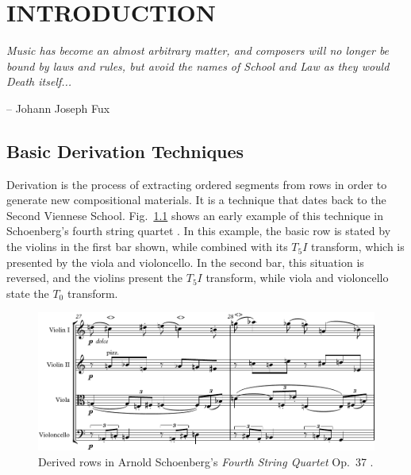 \chapter{INTRODUCTION}

\vspace{3em}
\setlength{\epigraphwidth}{0.86\textwidth}
\setlength{\epigraphrule}{0pt}
\epigraph{
	\textit{Music has become an almost arbitrary matter, and composers will no longer be bound by laws and rules, but avoid the names of School and Law as they would Death itself...}
}{\vspace{2em}-- Johann Joseph Fux}
\vspace{1em}

\section{Basic Derivation Techniques}

Derivation is the process of extracting ordered segments from rows in order to generate new compositional materials. It is a technique that dates back to the Second Viennese School. Fig.~\ref{fig:schoenberg-quartet} shows an early example of this technique in Schoenberg's fourth string quartet \cite[100]{Westergaard1966}. In this example, the basic row is stated by the violins in the first bar shown, while combined with its $T_5I$ transform, which is presented by the viola and violoncello. In the second bar, this situation is reversed, and the violins present the $T_5I$ transform, while viola and violoncello state the $T_0$ transform.

\begin{figure}[htbp]
    \centering
	\includegraphics[width=6.5in]{figures/Schoenberg_4.pdf}
	\caption[Schoenberg's \emph{Fourth String Quartet} Op.~37]{Derived rows in Arnold Schoenberg's \emph{Fourth String Quartet} Op.~37 \cite[100]{Westergaard1966}.}
	\label{fig:schoenberg-quartet}
\end{figure}

